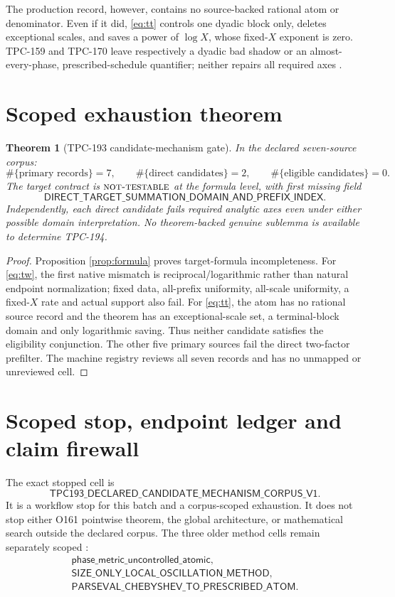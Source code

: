 \documentclass[11pt]{article}
\newtheorem{theorem}{Theorem}[section]
\newcommand{\NT}{\textnormal{\textsc{not-testable}}}
\begin{document}
The production record, however, contains no source-backed rational atom or
denominator.  Even if it did, \eqref{eq:tt} controls one dyadic block only,
deletes exceptional scales, and saves a power of \(\log X\), whose
fixed-\(X\) exponent is zero.  TPC-159 and TPC-170 leave respectively a
dyadic bad shadow or an almost-every-phase, prescribed-schedule
quantifier; neither repairs all required axes
\citep{WangTPC159,WangTPC170}.

\section{Scoped exhaustion theorem}

\begin{theorem}[TPC-193 candidate-mechanism gate]
\label{thm:gate}
In the declared seven-source corpus:
\[
 \#\{\text{primary records}\}=7,\qquad
 \#\{\text{direct candidates}\}=2,\qquad
 \#\{\text{eligible candidates}\}=0.
\]
The target contract is \(\NT\) at the formula level, with first missing
field
\[
 \mathsf{DIRECT\_TARGET\_SUMMATION\_DOMAIN\_AND\_PREFIX\_INDEX}.
\]
Independently, each direct candidate fails required analytic axes even
under either possible domain interpretation.  No theorem-backed genuine
sublemma is available to determine TPC-194.
\end{theorem}

\begin{proof}
Proposition \ref{prop:formula} proves target-formula incompleteness.  For
\eqref{eq:tw}, the first native mismatch is reciprocal/logarithmic rather
than natural endpoint normalization; fixed data, all-prefix uniformity,
all-scale uniformity, a fixed-\(X\) rate and actual support also fail.  For
\eqref{eq:tt}, the atom has no rational source record and the theorem has
an exceptional-scale set, a terminal-block domain and only logarithmic
saving.  Thus neither candidate satisfies the eligibility conjunction.
The other five primary sources fail the direct two-factor prefilter.  The
machine registry reviews all seven records and has no unmapped or
unreviewed cell.
\end{proof}

\section{Scoped stop, endpoint ledger and claim firewall}

The exact stopped cell is
\[
 \mathsf{TPC193\_DECLARED\_CANDIDATE\_MECHANISM\_CORPUS\_V1}.
\]
It is a workflow stop for this batch and a corpus-scoped exhaustion.  It
does not stop either O161 pointwise theorem, the global architecture, or
mathematical search outside the declared corpus.  The three older method
cells remain separately scoped \citep{WangTPC181,WangTPC187,WangTPC190}:
\[
\begin{gathered}
 \mathsf{phase\_metric\_uncontrolled\_atomic},\\
 \mathsf{SIZE\_ONLY\_LOCAL\_OSCILLATION\_METHOD},\\
 \mathsf{PARSEVAL\_CHEBYSHEV\_TO\_PRESCRIBED\_ATOM}.
\end{gathered}
\]
\end{document}
